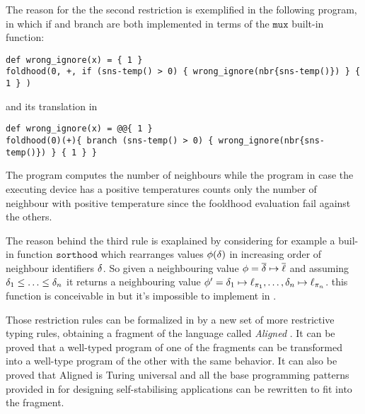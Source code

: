 The reason for the the second restriction is exemplified in the following program, in which if and branch are both implemented in terms of the $\mathtt{mux}$ built-in function:
\begin{lstlisting}[]
def wrong_ignore(x) = { 1 }
foldhood(0, +, if (sns-temp() > 0) { wrong_ignore(nbr{sns-temp()}) } { 1 } )
\end{lstlisting}
and its translation in  \FSCAFI{}
\begin{lstlisting}[]
def wrong_ignore(x) = @@{ 1 }
foldhood(0)(+){ branch (sns-temp() > 0) { wrong_ignore(nbr{sns-temp()}) } { 1 } }
\end{lstlisting}
The \HFC{} program computes the number of neighbours while the \FSCAFI{} program in case the executing device has a positive temperatures counts only the number of neighbour with positive temperature since the fooldhood evaluation fail against the others.

The reason behind the third rule is exaplained by considering for example a buil-in function $\mathtt{sorthood}$ which rearranges values $\phi(\delta)$ in increasing order of neighbour identifiers $\delta$. So given a neighbouring value $\phi = \overline{\delta}\mapsto \overline{\ell}$ and assuming $\delta_1 \leq \ldots \leq \delta_n$ it returns a neighbouring value $\phi' = \delta_1\mapsto \ell_{\pi_1}, \ldots, \delta_n\mapsto \ell_{\pi_n}$. this function is conceivable in \HFC{} but it's impossible to implement in \FSCAFI{}.

Those restriction rules can be formalized in \FSCAFI{} by a new set of more restrictive typing rules, obtaining a fragment of the language called \textit{Aligned} \FSCAFI{}. It can be proved \cite{Scafi} that a well-typed program of one of the fragments can be transformed into a well-type program of the other with the same behavior. It can also be proved that Aligned \FSCAFI{} is Turing universal and all the base programming patterns provided in \cite{SelfStabilizing} for designing self-stabilising applications can be rewritten to fit into the fragment.

